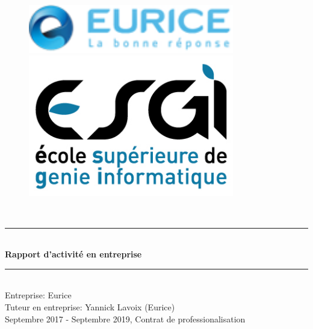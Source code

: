 \documentclass[11pt]{report}
\begin{document}
    \begin{titlepage}
    \begin{center} 
    \begin{figure}
        \centering
        \begin{minipage}{0.33\textwidth}
            \includegraphics[width=0.8\textwidth]{Images/eurice} %
        \end{minipage}
        \begin{minipage}{0.33\textwidth}
            \centering
            \includegraphics[width=0.8\textwidth]{Images/esgi} %
        \end{minipage}
    \end{figure}
    ~\\[3\baselineskip]
    
    \rule{\linewidth}{0.5mm} \\[0.4cm]
    { \huge \bfseries Rapport d'activité en entreprise\\[0.4cm] }
    \rule{\linewidth}{0.5mm} \\[1.5cm]
    
    {\large Entreprise: Eurice}\\[0.3cm]
    {\large Tuteur en entreprise: Yannick Lavoix (Eurice)}\\[0.3cm]
    {\large Septembre 2017 - Septembre 2019, Contrat de professionalisation}\\[0.3cm]
    \vfill
    \end{center}
    \end{titlepage}
    \clearpage
    
\end{document}
